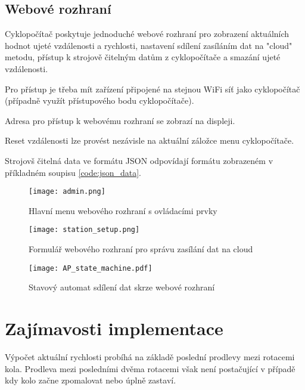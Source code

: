 \documentclass[twocolumn,a4paper,10pt]{article}
\begin{document}
\subsection{Webové rozhraní}\label{subsec:web}
Cyklopočítač poskytuje jednoduché webové rozhraní pro zobrazení aktuálních hodnot ujeté vzdálenosti a rychlosti, nastavení sdílení zasíláním dat na "cloud" metodu, přístup k strojově čitelným datům z cyklopočítače a smazání ujeté vzdálenosti.

Pro přístup je třeba mít zařízení připojené na stejnou WiFi síť jako cyklopočítač (případně využít přístupového bodu cyklopočítače).

Adresa pro přístup k webovému rozhraní se zobrazí na displeji.

Reset vzdálenosti lze provést nezávisle na aktuální záložce menu cyklopočítače.

Strojovš čitelná data ve formátu JSON odpovídají formátu zobrazeném v příkladném soupisu \ref{code:json_data}.

\begin{center}
    \begin{figure}[H]
        \centering
        \texttt{[image: admin.png]}
        \caption{Hlavní menu webového rozhraní s ovládacími prvky}
        \label{fig:admin}
    \end{figure}
\end{center}

\begin{center}
    \begin{figure}[H]
        \centering
        \texttt{[image: station\_setup.png]}
        \caption{Formulář webového rozhraní pro správu zasílání dat na cloud}
        \label{fig:cloud}
    \end{figure}
\end{center}

\begin{center}
    \begin{figure}[H]
        \centering
        \texttt{[image: AP\_state\_machine.pdf]}
        \caption{Stavový automat sdílení dat skrze webové rozhraní}
        \label{fig:AP_FSM}
    \end{figure}
\end{center}

\section{Zajímavosti implementace}\label{sec:impl_interests}
Výpočet aktuální rychlosti probíhá na základě poslední prodlevy mezi rotacemi kola. Prodleva mezi posledními dvěma rotacemi však není postačující v případě kdy kolo začne zpomalovat nebo úplně zastaví.
\end{document}
